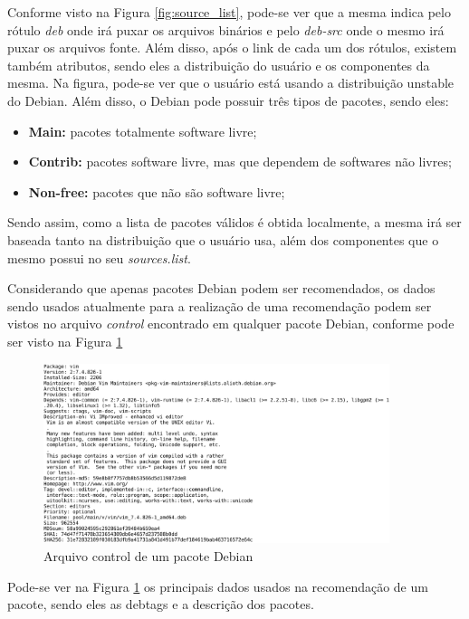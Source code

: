 Conforme visto na Figura \ref{fig:source_list}, pode-se ver que a mesma indica
pelo rótulo \textit{deb} onde irá puxar os arquivos binários e pelo
\textit{deb-src} onde o mesmo irá puxar os arquivos fonte. Além disso, após o
link de cada um dos rótulos, existem também atributos, sendo eles a distribuição
do usuário e os componentes da mesma. Na figura, pode-se ver que o usuário está
usando a distribuição unstable do Debian. Além disso, o Debian pode possuir três
tipos de pacotes, sendo eles:

\begin{itemize}
    \item \textbf{Main:} pacotes totalmente software livre;
    \item \textbf{Contrib:} pacotes software livre, mas que dependem de
        softwares não livres;
    \item \textbf{Non-free:} pacotes que não são software livre;
\end{itemize}

Sendo assim, como a lista de pacotes válidos é obtida localmente, a mesma irá ser baseada tanto na
distribuição que o usuário usa, além dos componentes que o mesmo possui no seu
\textit{sources.list}.

Considerando que apenas pacotes Debian podem ser recomendados, os dados sendo
usados atualmente para a realização de uma recomendação podem ser vistos no
arquivo \textit{control} encontrado em qualquer pacote Debian, conforme pode ser
visto na Figura \ref{fig:control_pacote}

\begin{figure}[h]
  \centering
  \includegraphics[width=0.9\textwidth]{figuras/control_pacote.eps}
  \caption{Arquivo control de um pacote Debian}
  \label{fig:control_pacote}
\end{figure}

Pode-se ver na Figura \ref{fig:control_pacote} os principais dados usados na
recomendação de um pacote, sendo eles as debtags e a descrição dos pacotes.

